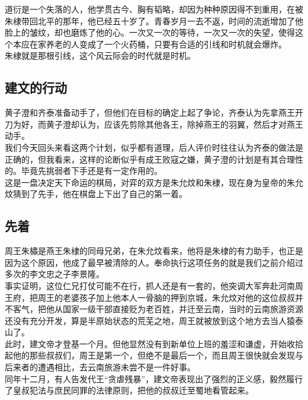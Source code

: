 \begin{multicols}{\theparacolNo}
道衍是一个失落的人，他学贯古今、胸有韬略，却因为种种原因得不到重用，在被朱棣带回北平的那年，他已经五十岁了。青春岁月一去不返，时间的流逝增加了他脸上的皱纹，却也磨炼了他的心。一次又一次的等待，一次又一次的失望，使得这个本应在家养老的人变成了一个火药桶，只要有合适的引线和时机就会爆炸。\\

朱棣就是那根引线，这个风云际会的时代就是时机。\\

\subsection{建文的行动}
黄子澄和齐泰准备动手了，但他们在目标的确定上起了争论，齐泰认为先拿燕王开刀为好，而黄子澄却认为，应该先剪除其他各王，除掉燕王的羽翼，然后才对燕王动手。\\

我们今天回头来看这两个计划，似乎都有道理，后人评价时往往认为齐泰的做法是正确的，但我看来，这样的论断似乎有成王败寇之嫌，黄子澄的计划是有其合理性的。毕竟先挑弱者下手还是有一定作用的。\\

这是一盘决定天下命运的棋局，对弈的双方是朱允炆和朱棣，现在身为皇帝的朱允炆猜到了先手，他在棋盘上下出了自己的第一着。\\

\subsection{先着}
周王朱橚是燕王朱棣的同母兄弟，在朱允炆看来，他将是朱棣的有力助手，也正是因为这个原因，他成了最早被清除的人。奉命执行这项任务的就是我们之前介绍过多次的李文忠之子李景隆。\\

事实证明，这位仁兄打仗可能不在行，抓人还是有一套的，他突调大军奔赴河南周王府，把周王的老婆孩子加上他本人一骨脑的押到京城，朱允炆对他的这位叔叔并不客气，把他从国家一级干部直接贬为老百姓，并迁至云南，当时的云南旅游资源还没有充分开发，算是半原始状态的荒芜之地，周王就被放到这个地方去当人猿泰山了。\\

此时，建文帝才登基一个月。但他显然没有到新单位上班的羞涩和谦虚，开始收拾起他的那些叔叔们，周王是第一个，但绝不是最后一个，而且周王很快就会发现与后来者的遭遇相比，去云南旅游未尝不是一件好事。\\

同年十二月，有人告发代王“贪虐残暴”，建文帝表现出了强烈的正义感，毅然履行了皇叔犯法与庶民同罪的法律原则，把他的叔叔迁至蜀地看管起来。\\


\end{multicols}
